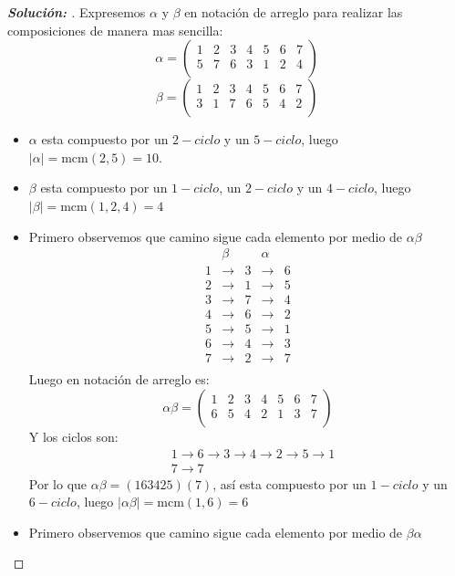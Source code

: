 \documentclass[12pt]{article}
\begin{document}
\begin{enumerate}
    \begin{proof}[\textbf{Solución: }]Expresemos $\alpha$ y $\beta$ en notación de arreglo para realizar las composiciones de manera mas sencilla:
    $$\alpha=\begin{pmatrix}
        1&2&3&4&5&6&7\\
        5&7&6&3&1&2&4\\
    \end{pmatrix}$$
    $$\beta=\begin{pmatrix}
        1&2&3&4&5&6&7\\
        3&1&7&6&5&4&2\\
    \end{pmatrix}$$
    \begin{itemize}
        \item $\alpha$ esta compuesto por un $2-ciclo$ y un $5-ciclo$, luego $|\alpha|=\text{mcm}(2,5)=10$. 
        \item $\beta$ esta compuesto por un $1-ciclo$, un $2-ciclo$ y un $4-ciclo$, luego $|\beta|=\text{mcm}(1,2,4)=4$
        \item Primero observemos que camino sigue cada elemento por medio de $\alpha\beta$
         $$\begin{matrix}
              &\beta& &\alpha& \\
            1 &\to &3&\to   &6\\
            2 &\to &1&\to   &5\\
            3 &\to &7&\to   &4\\
            4 &\to &6&\to   &2\\
            5 &\to &5&\to   &1\\
            6 &\to &4&\to   &3\\
            7 &\to &2&\to   &7\\
        \end{matrix}$$
        Luego en notación de arreglo es:
        $$\alpha\beta=\begin{pmatrix}
        1&2&3&4&5&6&7\\
        6&5&4&2&1&3&7\\
    \end{pmatrix}$$
    Y los ciclos son:
    \begin{align*}
           &1\to6\to3\to4\to2\to5\to1\\
           &7\to7
       \end{align*}
    Por lo que $\alpha\beta=(163425)(7)$, así esta compuesto por un $1-ciclo$ y un $6-ciclo$, luego $|\alpha\beta|=\text{mcm}(1,6)=6$
    \item Primero observemos que camino sigue cada elemento por medio de $\beta\alpha$

\end{itemize}
\end{proof}
\end{enumerate}
\end{document}
